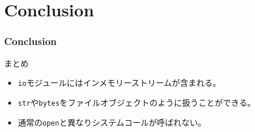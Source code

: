 \documentclass[aspectratio=169,dvipdfmx,14pt,notheorems]{beamer}
\theoremstyle{definition}
\begin{document}
\section{Conclusion}

\begin{frame}[fragile]\frametitle{Conclusion}
\begin{block}{まとめ}
\begin{itemize}
\item \texttt{io}モジュールにはインメモリーストリームが含まれる。
\item \texttt{str}や\texttt{bytes}をファイルオブジェクトのように扱うことができる。
\item 通常の\texttt{open}と異なりシステムコールが呼ばれない。
\end{itemize}
\end{block}
\end{frame}
\end{document}
